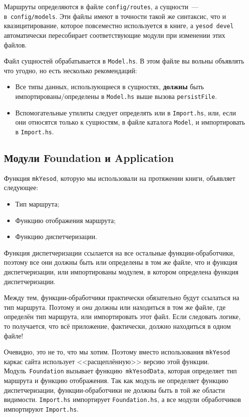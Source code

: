 Маршруты определяются в файле \texttt{config/routes}, а сущности~---
в~\texttt{config/models}.  Эти файлы имеют в точности такой же синтаксис, что и
квазицитирование, которое повсеместно используется в книге, а \texttt{yesod
devel} автоматически пересобирает соответствующие модули при изменении этих
файлов.

Файл сущностей обрабатывается в \texttt{Model.hs}. В этом файле вы вольны
объявлять что угодно, но есть несколько рекомендаций:
\begin{itemize}
    \item Все типы данных, использующиеся в сущностях, \textbf{должны} быть
        импортированы/определены в \texttt{Model.hs} выше вызова
        \lstinline!persistFile!.
    \item Вспомогательные утилиты следует определять или в \texttt{Import.hs},
        или, если они относятся только к сущностям, в файле каталога
        \texttt{Model}, и импортировать в \texttt{Import.hs}.
\end{itemize}

\subsection{Модули Foundation и Application}
Функция \lstinline!mkYesod!, которую мы использовали на протяжении книги,
объявляет следующее:
\begin{itemize}
  \item Тип маршрута;
  \item Функцию отображения маршрута;
  \item Функцию диспетчеризации.
\end{itemize}

Функция диспетчеризации ссылается на все остальные функции-обработчики, поэтому
все они должны быть или определены в том же файле, что и функция
диспетчеризации, или импортированы модулем, в котором определена функция
диспетчеризации.

Между тем, функции-обработчики практически обязательно будут ссылаться на тип
маршрута. Поэтому и \emph{они} должны или находиться в том же файле, где
определён тип маршрута, или импортировать этот файл.  Если следовать логике, то
получается, что всё приложение, фактически, должно находиться в одном файле!

Очевидно, это не то, что мы хотим. Поэтому вместо использования
\lstinline!mkYesod! каркас сайта использует <<расщеплённую>> версию этой
функции. Модуль~\lstinline!Foundation! вызывает функцию~\lstinline!mkYesodData!,
которая определяет тип маршрута и функцию отображения. Так как модуль не
определяет функцию диспетчеризации, функции-обработчики не должны быть в той же
области видимости. \texttt{Import.hs} импортирует \texttt{Foundation.hs}, а все
модули обработчиков импортируют \texttt{Import.hs}.

